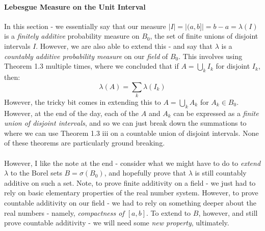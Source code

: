 \documentclass[12pt,a4paper]{article}
\newcommand{\1}[1]{\mathbbm{1}\left\{ #1 \right\}}
\begin{document}
\paragraph{Lebesgue Measure on the Unit Interval}
In this section - we essentially say that our measure $|I| = |(a,b]| = b - a = \lambda(I)$ is a \textit{finitely additive} probability measure on $B_0$, the set of finite unions of disjoint intervals $I$. However, we are also able to extend this - and say that $\lambda$ is a \textit{countably additive probability measure} on our \textit{field} of $B_0$. This involves using Theorem 1.3 multiple times, where we concluded that if $A = \bigcup_{k} I_k$ for disjoint $I_k$, then:
$$
	\lambda(A) = \sum_k \lambda(I_k)
$$
However, the tricky bit comes in extending this to $A = \bigcup_k A_k$ for $A_k \in B_0$. However, at the end of the day, each of the $A$ and $A_k$ can be expressed as a \textit{finite union of disjoint intervals}, and so we can just break down the summations to where we can use Theorem 1.3 iii on a countable union of disjoint intervals. None of these theorems are particularly ground breaking.
\\\\
However, I like the note at the end - consider what we might have to do to \textit{extend} $\lambda$ to the Borel sets $B = \sigma(B_0)$, and hopefully prove that $\lambda$ is still countably additive on such a set. Note, to prove finite additivity on a field - we just had to rely on basic elementary properties of the real number system. However, to prove countable additivity on our field - we had to rely on something deeper about the real numbers - namely, \textit{compactness of $[a,b]$}. To extend to $B$, however, and still prove countable additivity - we will need some \textit{new property}, ultimately.
\end{document}
